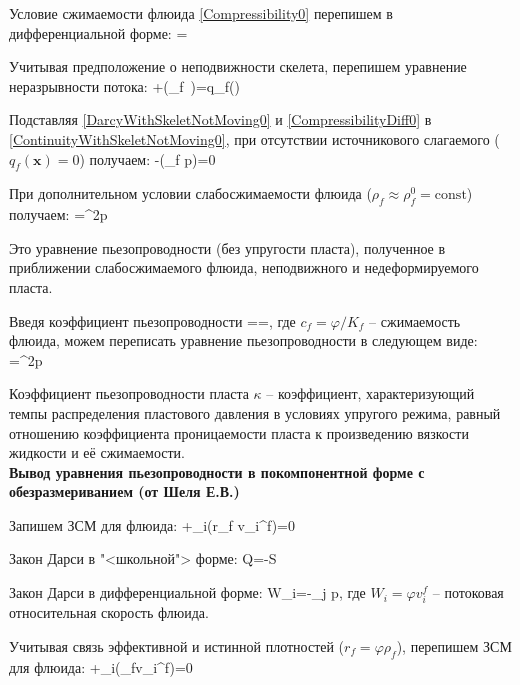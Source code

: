 Условие сжимаемости флюида \eqref{Compressibility0} перепишем в дифференциальной форме:
\beq\label{CompressibilityDiff0}
=
\eeq

Учитывая предположение о неподвижности скелета, перепишем уравнение неразрывности потока:
\beq\label{ContinuityWithSkeletNotMoving0}
\varphi{}+\pmb{\nabla}\cdot\left(\rho_f\varphi \, \right)=q_f()
\eeq

Подставляя \eqref{DarcyWithSkeletNotMoving0} и \eqref{CompressibilityDiff0} в \eqref{ContinuityWithSkeletNotMoving0}, при отсутствии источникового слагаемого ($q_f(\pmb{x})=0$) получаем:
\beq
\varphi{}-\pmb{\nabla}\cdot\left(\rho_f\pmb{\nabla} p\right)=0
\eeq

При дополнительном условии слабосжимаемости флюида ($\rho_f\approx\rho_f^0=\textrm{const}$) получаем:
\beq
{}=\pmb{\nabla}^2p
\eeq

Это уравнение пьезопроводности (без упругости пласта), полученное в приближении слабосжимаемого флюида, неподвижного и недеформируемого пласта.

Введя коэффициент пьезопроводности
\beq
\kappa==,
\eeq
где $c_f=\varphi/K_f$ -- сжимаемость флюида, можем переписать уравнение пьезопроводности в следующем виде:
\beq
{}=\kappa\pmb{\nabla}^2p
\eeq

Коэффициент пьезопроводности пласта $\kappa$ -- коэффициент, характеризующий темпы распределения пластового давления в условиях упругого режима, равный отношению коэффициента проницаемости пласта к произведению вязкости жидкости и её сжимаемости.
\\

\textbf{Вывод уравнения пьезопроводности в покомпонентной форме с обезразмериванием (от Шеля Е.В.)}

Запишем ЗСМ для флюида:
\beq
{}+\partial_i\left(r_f v_i^f\right)=0
\eeq

Закон Дарси в "<школьной"> форме:
\beq
Q=-S
\eeq

Закон Дарси в дифференциальной форме:
\beq\label{DarcyDiffShel0}
W_i=-\partial_j p,
\eeq
где $W_i=\varphi v_i^f$ -- потоковая относительная скорость флюида.

Учитывая связь эффективной и истинной плотностей ($r_f=\varphi\rho_f$), перепишем ЗСМ для флюида:
\beq\label{ContinuityShel0}
+\partial_i\left(\rho_f\varphi v_i^f\right)=0
\eeq

